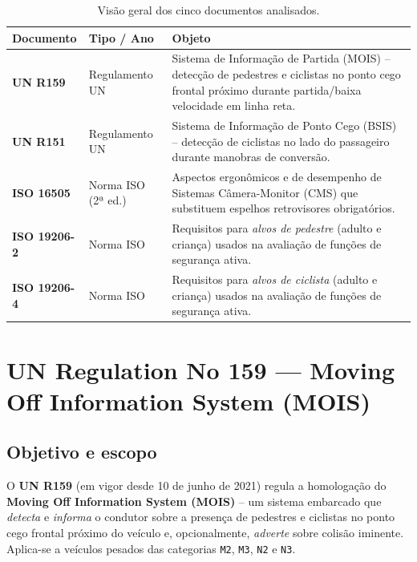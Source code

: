 \documentclass[11pt,a4paper]{article}
\begin{document}
\begin{table}[H]
\centering
\caption{Visão geral dos cinco documentos analisados.}
\label{tab:overview}
\small
\begin{tabularx}{\linewidth}{@{}p{2.5cm}p{2.4cm}X@{}}
\toprule
\textbf{Documento} & \textbf{Tipo / Ano} & \textbf{Objeto} \\
\midrule
\textbf{UN R159} & Regulamento UN\newline 2021 &
Sistema de Informação de Partida (MOIS) -- detecção de pedestres e ciclistas
no ponto cego frontal próximo durante partida/baixa velocidade em linha reta. \\
\addlinespace
\textbf{UN R151} & Regulamento UN\newline 2020 &
Sistema de Informação de Ponto Cego (BSIS) -- detecção de ciclistas no lado
do passageiro durante manobras de conversão. \\
\addlinespace
\textbf{ISO 16505} & Norma ISO\newline 2019 (2ª ed.) &
Aspectos ergonômicos e de desempenho de Sistemas Câmera-Monitor (CMS) que
substituem espelhos retrovisores obrigatórios. \\
\addlinespace
\textbf{ISO 19206-2} & Norma ISO\newline 2018 &
Requisitos para \emph{alvos de pedestre} (adulto e criança) usados na
avaliação de funções de segurança ativa. \\
\addlinespace
\textbf{ISO 19206-4} & Norma ISO\newline 2020 &
Requisitos para \emph{alvos de ciclista} (adulto e criança) usados na
avaliação de funções de segurança ativa. \\
\bottomrule
\end{tabularx}
\end{table}

\clearpage
\section{UN Regulation No 159 --- Moving Off Information System (MOIS)}

\subsection{Objetivo e escopo}

O \textbf{UN R159} (em vigor desde 10 de junho de 2021) regula a homologação do
\textbf{Moving Off Information System (MOIS)} -- um sistema embarcado que
\emph{detecta} e \emph{informa} o condutor sobre a presença de pedestres e
ciclistas no ponto cego frontal próximo do veículo e, opcionalmente,
\emph{adverte} sobre colisão iminente. Aplica-se a veículos pesados das
categorias \texttt{M2}, \texttt{M3}, \texttt{N2} e \texttt{N3}.
\end{document}
